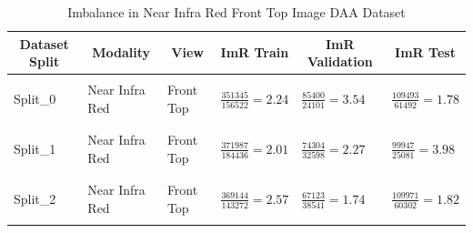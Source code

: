 \begin{table}[htbp]
\caption{Imbalance in Near Infra Red Front Top Image DAA Dataset}
\label{nir imbalance-table}
\begin{center}
\small
\begin{tabular}{llllll}
\multicolumn{1}{c}{\bf Dataset Split}  &\multicolumn{1}{c}{\bf Modality} &\multicolumn{1}{c}{\bf View} &\multicolumn{1}{c}{\bf ImR Train} &\multicolumn{1}{c}{\bf ImR Validation} &\multicolumn{1}{c}{\bf ImR Test}
\\ \hline \\
Split\_0         &Near Infra Red  &Front Top  & $\frac{351345}{156522} = 2.24$ & $\frac{85400}{24101} = 3.54$ & $\frac{109493}{61492} = 1.78$ \\
\\ \hline \\
Split\_1             &Near Infra Red  &Front Top & $\frac{371987}{184436} = 2.01$ & $\frac{74304}{32598} = 2.27$ & $\frac{99947}{25081} = 3.98$ \\
\\ \hline \\
Split\_2             &Near Infra Red & Front Top & $\frac{369144}{143272} = 2.57$ & $\frac{67123}{38541} = 1.74$ & $\frac{109971}{60302} = 1.82$  \\
\\ \hline
\end{tabular}
\end{center}
\end{table}

